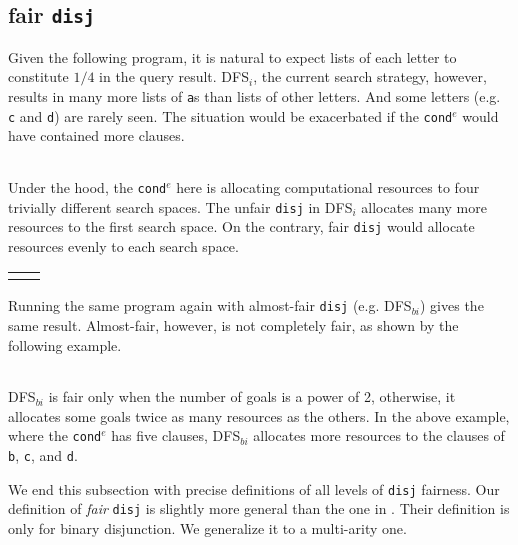 \documentclass[format=acmlarge, review=true, authordraft=true]{acmart}
\newcommand{\conde}{\texttt{cond$^e$}}
\newcommand{\disj}{\texttt{disj}}
\newcommand{\DFSi }[0]{DFS$_{i}$}
\newcommand{\DFSbi}[0]{DFS$_{bi}$}
\begin{document}
\subsection{fair \texttt{disj}}

Given the following program, it is natural to expect lists of each letter to
constitute $1/4$ in the query result. \DFSi, the current search
strategy, however, results in many more lists of \texttt{a}s than lists
of other letters. And some letters  (e.g. \texttt{c} and \texttt{d}) are
rarely seen. The situation would be exacerbated if the \conde{} would have
contained more clauses.

\begin{center}
	\begin{tabular}{c}
		
	\end{tabular}
\end{center}

Under the hood, the \conde{} here is allocating computational resources to 
four trivially different search spaces. The unfair \disj{} in 
\DFSi{} allocates many more resources to the first search space. On the 
contrary, fair \disj{} would allocate resources evenly to each search space. 

\begin{center}
	\begin{tabular}{l|r}
		 &
		
	\end{tabular}
\end{center}

Running the same program again with almost-fair \disj {} (e.g. 
\DFSbi{}) gives the same result. Almost-fair, however, is not 
completely fair, as shown by the following example. 

\begin{center}
	\begin{tabular}{c}
		
	\end{tabular}
\end{center}

\DFSbi{} is fair only when the number of goals is a power of 2, 
otherwise, it allocates some goals twice as many resources as the 
others. In the above example, where the \conde{} has five clauses, \DFSbi{} 
allocates more resources to the clauses of \texttt{b}, \texttt{c}, and 
\texttt{d}.

We end this subsection with precise definitions of all levels of 
\disj{} fairness. Our definition of \emph{fair} \disj{} is slightly 
more general
than the one in \citet{seres1999algebra}. Their definition is only
for binary disjunction. We generalize it to a multi-arity one.
\end{document}

